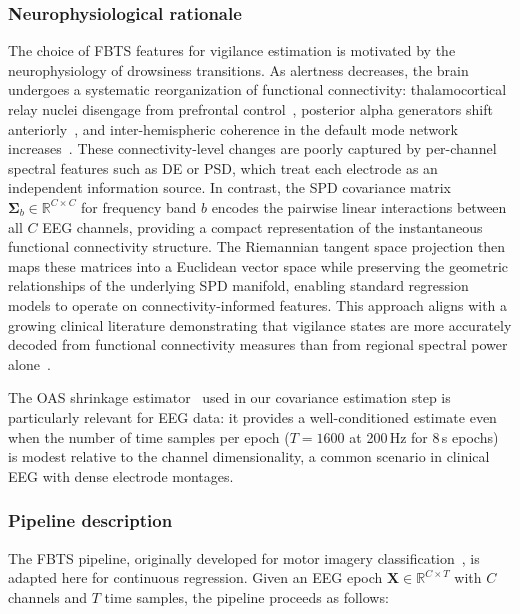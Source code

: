 \documentclass{iopjournal}
\begin{document}
\subsubsection{Neurophysiological rationale}

The choice of FBTS features for vigilance estimation is motivated by the neurophysiology of drowsiness transitions. As alertness decreases, the brain undergoes a systematic reorganization of functional connectivity: thalamocortical relay nuclei disengage from prefrontal control~\cite{tagliazucchi2014large}, posterior alpha generators shift anteriorly~\cite{strijkstra2003subjective}, and inter-hemispheric coherence in the default mode network increases~\cite{olbrich2012eeg}. These connectivity-level changes are poorly captured by per-channel spectral features such as DE or PSD, which treat each electrode as an independent information source. In contrast, the SPD covariance matrix $\mathbf{\Sigma}_b \in \mathbb{R}^{C \times C}$ for frequency band $b$ encodes the pairwise linear interactions between all $C$ EEG channels, providing a compact representation of the instantaneous functional connectivity structure. The Riemannian tangent space projection then maps these matrices into a Euclidean vector space while preserving the geometric relationships of the underlying SPD manifold, enabling standard regression models to operate on connectivity-informed features. This approach aligns with a growing clinical literature demonstrating that vigilance states are more accurately decoded from functional connectivity measures than from regional spectral power alone~\cite{tagliazucchi2014large}.

The OAS shrinkage estimator~\cite{chen2010shrinkage} used in our covariance estimation step is particularly relevant for EEG data: it provides a well-conditioned estimate even when the number of time samples per epoch ($T=1600$ at 200\,Hz for 8\,s epochs) is modest relative to the channel dimensionality, a common scenario in clinical EEG with dense electrode montages.

\subsubsection{Pipeline description}

The FBTS pipeline, originally developed for motor imagery classification~\cite{barachant2012multiclass}, is adapted here for continuous regression. Given an EEG epoch $\mathbf{X} \in \mathbb{R}^{C \times T}$ with $C$ channels and $T$ time samples, the pipeline proceeds as follows:
\end{document}
